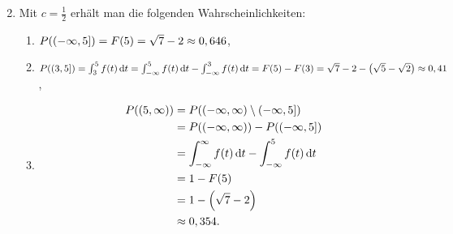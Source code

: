 \documentclass{exercise}
\begin{document}
\begin{enumerate}
\[        \]
        \item Mit \(c = \frac{1}{2}\) erhält man die folgenden Wahrscheinlichkeiten:
        \begin{enumerate}
            \item \(P\parentheses*{\left(-\infty, 5\right]} = F\parentheses*{5} = \sqrt{7} - 2 \approx 0,646\),
            \item \(P\parentheses*{\left(3, 5\right]} = \int_3^5 f\parentheses*{t}\d t = \int_{-\infty}^5 f\parentheses*{t}\d t - \int_{-\infty}^3 f\parentheses*{t}\d t = F\parentheses*{5} - F\parentheses*{3} = \sqrt{7} - 2 - \parentheses*{\sqrt{5} - \sqrt{2}} \approx 0,41\),
            \item
            \begin{align*}
                P\parentheses*{\parentheses*{5, \infty}} &= P\parentheses*{\parentheses*{-\infty, \infty} \setminus \left(-\infty, 5\right]}\\
                &= P\parentheses*{\parentheses*{-\infty, \infty}} - P\parentheses*{\left(-\infty, 5\right]}\\
                &= \int_{-\infty}^\infty f\parentheses*{t}\d t - \int_{-\infty}^5 f\parentheses*{t}\d t\\
                &= 1 - F\parentheses*{5}\\
                &= 1 - \parentheses*{\sqrt{7} - 2}\\
                &\approx 0,354.
            \end{align*}
        \end{enumerate}
    \end{enumerate}
\end{document}

